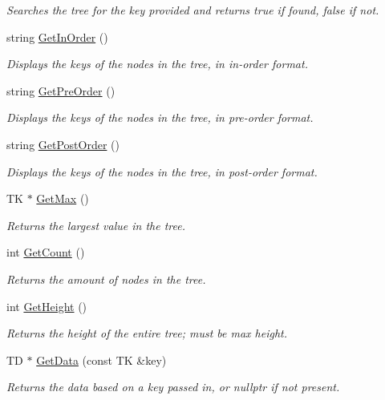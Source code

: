 \begin{DoxyCompactItemize}
\begin{DoxyCompactList}\small\item\em Searches the tree for the key provided and returns true if found, false if not. \end{DoxyCompactList}\item 
string \hyperlink{classBinarySearchTree_af91f7e6c512aa0ff6e3d75a1d8cc0746}{Get\+In\+Order} ()
\begin{DoxyCompactList}\small\item\em Displays the keys of the nodes in the tree, in in-\/order format. \end{DoxyCompactList}\item 
string \hyperlink{classBinarySearchTree_a5bf79ef6e69aa6ac90a9aa69eda5fc2f}{Get\+Pre\+Order} ()
\begin{DoxyCompactList}\small\item\em Displays the keys of the nodes in the tree, in pre-\/order format. \end{DoxyCompactList}\item 
string \hyperlink{classBinarySearchTree_a955641b38b09fad48dff386212b5e692}{Get\+Post\+Order} ()
\begin{DoxyCompactList}\small\item\em Displays the keys of the nodes in the tree, in post-\/order format. \end{DoxyCompactList}\item 
TK $\ast$ \hyperlink{classBinarySearchTree_acadafc04cb0d80f8bb8127bec3617c18}{Get\+Max} ()
\begin{DoxyCompactList}\small\item\em Returns the largest value in the tree. \end{DoxyCompactList}\item 
int \hyperlink{classBinarySearchTree_a549c69be4369b93719fabafb10eed383}{Get\+Count} ()
\begin{DoxyCompactList}\small\item\em Returns the amount of nodes in the tree. \end{DoxyCompactList}\item 
int \hyperlink{classBinarySearchTree_a024149bb1d2b82953d691c6312916c1a}{Get\+Height} ()
\begin{DoxyCompactList}\small\item\em Returns the height of the entire tree; must be max height. \end{DoxyCompactList}\item 
TD $\ast$ \hyperlink{classBinarySearchTree_ad07f224e9b68ef681ddec73f0cd6e56e}{Get\+Data} (const TK \&key)
\begin{DoxyCompactList}\small\item\em Returns the data based on a key passed in, or nullptr if not present. \end{DoxyCompactList}\end{DoxyCompactItemize}
